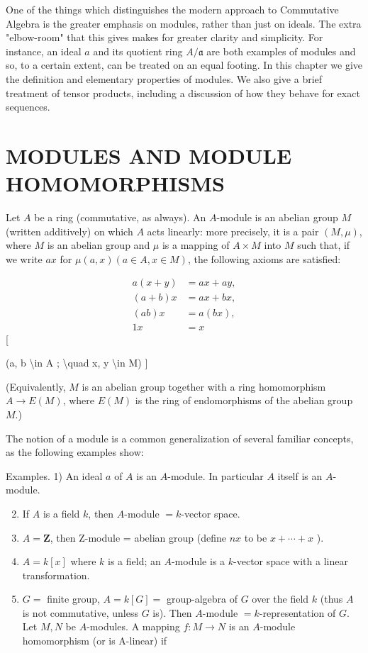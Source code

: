 \documentclass{standalone}
\theoremstyle{definition}
\theoremstyle{remark}
\begin{document}
One of the things which distinguishes the modern approach to Commutative Algebra is the greater emphasis on modules, rather than just on ideals. The extra "elbow-room" that this gives makes for greater clarity and simplicity. For instance, an ideal $a$ and its quotient ring $A / \mathfrak{a}$ are both examples of modules and so, to a certain extent, can be treated on an equal footing. In this chapter we give the definition and elementary properties of modules. We also give a brief treatment of tensor products, including a discussion of how they behave for exact sequences.

\section{MODULES AND MODULE HOMOMORPHISMS}
Let $A$ be a ring (commutative, as always). An $A$-module is an abelian group $M$ (written additively) on which $A$ acts linearly: more precisely, it is a pair $(M, \mu)$, where $M$ is an abelian group and $\mu$ is a mapping of $A \times M$ into $M$ such that, if we write $a x$ for $\mu(a, x)(a \in A, x \in M)$, the following axioms are satisfied:

\[
\begin{aligned}
a(x+y) & =a x+a y, \\
(a+b) x & =a x+b x, \\
(a b) x & =a(b x), \\
1 x & =x
\end{aligned}
\][

(a, b \textbackslash in A ; \textbackslash quad x, y \textbackslash in M) 
]

(Equivalently, $M$ is an abelian group together with a ring homomorphism $A \rightarrow E(M)$, where $E(M)$ is the ring of endomorphisms of the abelian group $M$.)

The notion of a module is a common generalization of several familiar concepts, as the following examples show:

Examples. 1) An ideal $a$ of $A$ is an $A$-module. In particular $A$ itself is an $A$-module.

\begin{enumerate}
  \setcounter{enumi}{1}
  \item If $A$ is a field $k$, then $A$-module $=k$-vector space.

  \item $A=\mathbf{Z}$, then Z-module = abelian group (define $n x$ to be $x+\cdots+x$ ).

  \item $A=k[x]$ where $k$ is a field; an $A$-module is a $k$-vector space with a linear transformation.

  \item $G=$ finite group, $A=k[G]=$ group-algebra of $G$ over the field $k$ (thus $A$ is not commutative, unless $G$ is). Then $A$-module $=k$-representation of $G$. Let $M, N$ be $A$-modules. A mapping $f: M \rightarrow N$ is an $A$-module homomorphism (or is A-linear) if

\end{enumerate}
\end{document}
